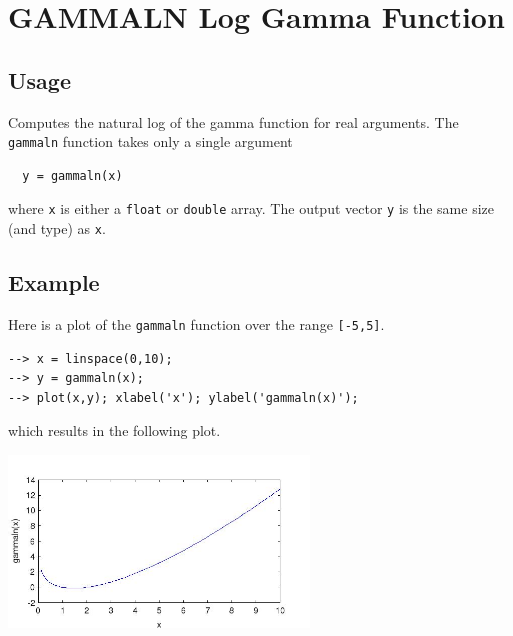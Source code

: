 \section{GAMMALN Log Gamma Function}

\subsection{Usage}

Computes the natural log of the gamma function for real arguments.  The \verb|gammaln|
function takes only a single argument
\begin{verbatim}
  y = gammaln(x)
\end{verbatim}
where \verb|x| is either a \verb|float| or \verb|double| array.  The output
vector \verb|y| is the same size (and type) as \verb|x|.
\subsection{Example}

Here is a plot of the \verb|gammaln| function over the range \verb|[-5,5]|.
\begin{verbatim}
--> x = linspace(0,10);
--> y = gammaln(x);
--> plot(x,y); xlabel('x'); ylabel('gammaln(x)');
\end{verbatim}
which results in the following plot.


\centerline{\includegraphics[width=8cm]{gammaln1}}

